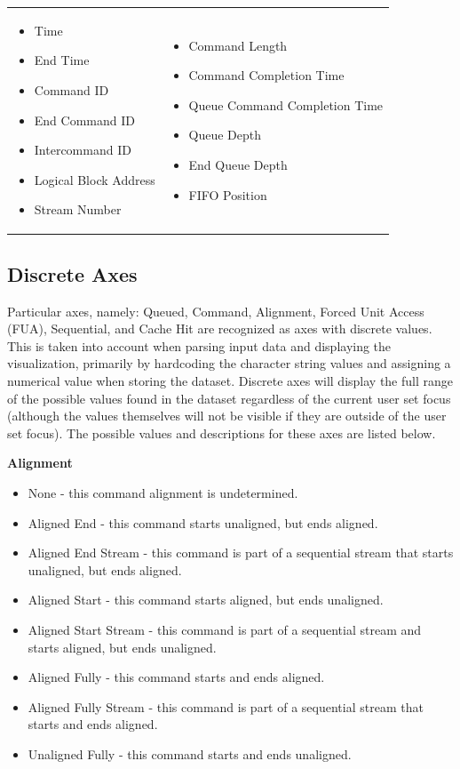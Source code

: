 \documentclass[journal]{vgtc}                %
\begin{document}
\begin{tabular}{p{}p{}}
\begin{itemize}
\item Time
\item End Time
\item Command ID
\item End Command ID
\item Intercommand ID
\item Logical Block Address
\item Stream Number
\end{itemize}
&
\begin{itemize}
\item Command Length
\item Command Completion Time
\item Queue Command Completion Time
\item Queue Depth
\item End Queue Depth
\item FIFO Position
\end{itemize}
\end{tabular}

\subsection{Discrete Axes}
Particular axes, namely: Queued, Command, Alignment, Forced Unit Access (FUA), Sequential, and Cache Hit are recognized as axes with discrete values. This is taken into account when parsing input data and displaying the visualization, primarily by hardcoding the character string values and assigning a numerical value when storing the dataset. Discrete axes will display the full range of the possible values found in the dataset regardless of the current user set focus (although the values themselves will not be visible if they are outside of the user set focus). The possible values and descriptions for these axes are listed below.\newline

\noindent \textbf{Alignment}
\begin{itemize}
\item None - this command alignment is undetermined.
\item Aligned End - this command starts unaligned, but ends aligned.
\item Aligned End Stream - this command is part of a sequential stream that starts unaligned, but ends aligned.
\item Aligned Start - this command starts aligned, but ends unaligned.
\item Aligned Start Stream - this command is part of a sequential stream and starts aligned, but ends unaligned.
\item Aligned Fully - this command starts and ends aligned.
\item Aligned Fully Stream - this command is part of a sequential stream that starts and ends aligned.
\item Unaligned Fully - this command starts and ends unaligned.
\end{itemize}
\end{document}

